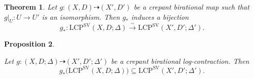 \documentclass[reqno, 12pt]{amsart}
\newtheorem{prop}{Proposition}[section]
\newtheorem{thm}[prop]{Theorem}
\theoremstyle{definition}
\newcommand{\bA}{\mathbb{A}}
\newcommand{\bQ}{\mathbb{Q}}
\newcommand{\cX}{\mathcal{X}}
\newcommand{\cE}{\mathcal{E}}
\newcommand{\cD}{\mathcal{D}}
\newcommand{\cH}{\mathcal{H}}
\newcommand{\Supp}{\mathrm{Supp}}
\newcommand{\SV}{\mathrm{SV}}
\newcommand{\hcX}{\widehat{\mathcal{X}}}
\newcommand{\LCP}{\mathrm{LCP}}
\numberwithin{equation}{section}
\begin{document}

\begin{thm}\label{thm:sv}
Let $g: (X,D) \dashrightarrow (X',D')$ be a crepant birational map such that $g|_U: U\to U'$ is an isomorphism. Then $g_*$ induces a bijection
\[
g_*:\LCP^{\SV}(X,D;\Delta)\xrightarrow{\sim}\LCP^{\SV}(X',D';\Delta').
\]
\end{thm}


\begin{prop}\label{prop:SV-contraction}

Let
$g:(X,D;\Delta)\dashrightarrow (X',D';\Delta')$
be a crepant birational log-contraction. Then
\[
g_*\bigl(\LCP^{\SV}(X,D;\Delta)\bigr)
\subseteq
\LCP^{\SV}(X',D';\Delta').
\]
\end{prop}
\end{document}
